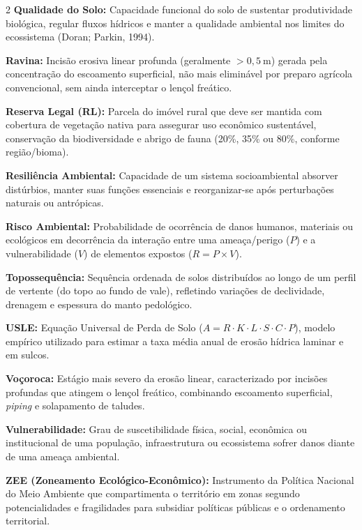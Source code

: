 \begin{multicols}{2}
\noindent\textbf{\color{uefsNavy}Qualidade do Solo:} Capacidade funcional do solo de sustentar produtividade biológica, regular fluxos hídricos e manter a qualidade ambiental nos limites do ecossistema (Doran; Parkin, 1994).

\noindent\textbf{\color{uefsNavy}Ravina:} Incisão erosiva linear profunda (geralmente $> 0,5\ \text{m}$) gerada pela concentração do escoamento superficial, não mais eliminável por preparo agrícola convencional, sem ainda interceptar o lençol freático.

\noindent\textbf{\color{uefsNavy}Reserva Legal (RL):} Parcela do imóvel rural que deve ser mantida com cobertura de vegetação nativa para assegurar uso econômico sustentável, conservação da biodiversidade e abrigo de fauna (20\%, 35\% ou 80\%, conforme região/bioma).

\noindent\textbf{\color{uefsNavy}Resiliência Ambiental:} Capacidade de um sistema socioambiental absorver distúrbios, manter suas funções essenciais e reorganizar-se após perturbações naturais ou antrópicas.

\noindent\textbf{\color{uefsNavy}Risco Ambiental:} Probabilidade de ocorrência de danos humanos, materiais ou ecológicos em decorrência da interação entre uma ameaça/perigo ($P$) e a vulnerabilidade ($V$) de elementos expostos ($R = P \times V$).

\noindent\textbf{\color{uefsNavy}Topossequência:} Sequência ordenada de solos distribuídos ao longo de um perfil de vertente (do topo ao fundo de vale), refletindo variações de declividade, drenagem e espessura do manto pedológico.

\noindent\textbf{\color{uefsNavy}USLE:} Equação Universal de Perda de Solo ($A = R \cdot K \cdot L \cdot S \cdot C \cdot P$), modelo empírico utilizado para estimar a taxa média anual de erosão hídrica laminar e em sulcos.

\noindent\textbf{\color{uefsNavy}Voçoroca:} Estágio mais severo da erosão linear, caracterizado por incisões profundas que atingem o lençol freático, combinando escoamento superficial, \textit{piping} e solapamento de taludes.

\noindent\textbf{\color{uefsNavy}Vulnerabilidade:} Grau de suscetibilidade física, social, econômica ou institucional de uma população, infraestrutura ou ecossistema sofrer danos diante de uma ameaça ambiental.

\noindent\textbf{\color{uefsNavy}ZEE (Zoneamento Ecológico-Econômico):} Instrumento da Política Nacional do Meio Ambiente que compartimenta o território em zonas segundo potencialidades e fragilidades para subsidiar políticas públicas e o ordenamento territorial.
\end{multicols}

